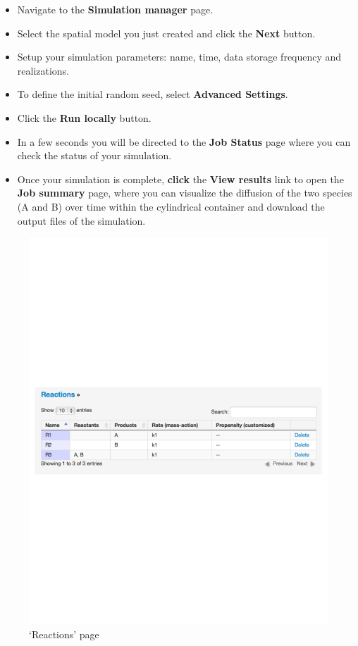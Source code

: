 \begin{itemize}
\item Navigate to the \textbf{Simulation manager} page.

\item Select the spatial model you just created and click the \textbf{Next} button.
\item Setup your simulation parameters: name, time, data storage frequency and realizations. 
\item To define the initial random seed, select \textbf{Advanced Settings}.
\item Click the \textbf{Run locally} button.
\item In a few seconds you will be directed to the \textbf{Job Status} page where you can check the status of your simulation.
\item Once your simulation is complete, \textbf{click} the \textbf{View results} link to open the \textbf{Job summary} page, where you can visualize the diffusion of the two species (A and B) over time within the cylindrical container and download the output files of the simulation.

\end{itemize}

\begin{figure}[!ht]
\centering
\includegraphics[scale=0.64]{T4/reactions-spatial.pdf}
\caption{`Reactions' page}
\label{fig:2}
\end{figure}


